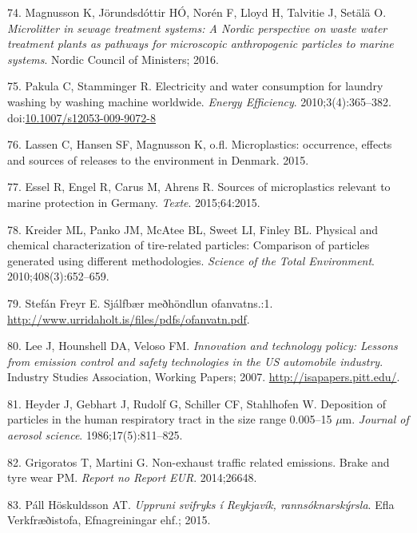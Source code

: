 \documentclass[icelandic,]{book}
\begin{document}
\leavevmode\hypertarget{ref-magnusson2016microlitter}{}%
74. Magnusson K, Jörundsdóttir HÓ, Norén F, Lloyd H, Talvitie J, Setälä O. \emph{Microlitter in sewage treatment systems: A Nordic perspective on waste water treatment plants as pathways for microscopic anthropogenic particles to marine systems}. Nordic Council of Ministers; 2016.

\leavevmode\hypertarget{ref-Pakula2010}{}%
75. Pakula C, Stamminger R. Electricity and water consumption for laundry washing by washing machine worldwide. \emph{Energy Efficiency}. 2010;3(4):365--382. doi:\href{https://doi.org/10.1007/s12053-009-9072-8}{10.1007/s12053-009-9072-8}

\leavevmode\hypertarget{ref-lassen2015microplastics}{}%
76. Lassen C, Hansen SF, Magnusson K, o.fl. Microplastics: occurrence, effects and sources of releases to the environment in Denmark. 2015.

\leavevmode\hypertarget{ref-essel2015sources}{}%
77. Essel R, Engel R, Carus M, Ahrens R. Sources of microplastics relevant to marine protection in Germany. \emph{Texte}. 2015;64:2015.

\leavevmode\hypertarget{ref-kreider2010physical}{}%
78. Kreider ML, Panko JM, McAtee BL, Sweet LI, Finley BL. Physical and chemical characterization of tire-related particles: Comparison of particles generated using different methodologies. \emph{Science of the Total Environment}. 2010;408(3):652--659.

\leavevmode\hypertarget{ref-StefanFreyr}{}%
79. Stefán Freyr E. Sjálfbær meðhöndlun ofanvatns.:1. \url{http://www.urridaholt.is/files/pdfs/ofanvatn.pdf}.

\leavevmode\hypertarget{ref-lee2007innovation}{}%
80. Lee J, Hounshell DA, Veloso FM. \emph{Innovation and technology policy: Lessons from emission control and safety technologies in the US automobile industry}. Industry Studies Association, Working Papers; 2007. \url{http://isapapers.pitt.edu/}.

\leavevmode\hypertarget{ref-heyder1986deposition}{}%
81. Heyder J, Gebhart J, Rudolf G, Schiller CF, Stahlhofen W. Deposition of particles in the human respiratory tract in the size range 0.005--15 \(\mu\)m. \emph{Journal of aerosol science}. 1986;17(5):811--825.

\leavevmode\hypertarget{ref-grigoratos2014non}{}%
82. Grigoratos T, Martini G. Non-exhaust traffic related emissions. Brake and tyre wear PM. \emph{Report no Report EUR}. 2014;26648.

\leavevmode\hypertarget{ref-Efla2015}{}%
83. Páll Höskuldsson AT. \emph{Uppruni svifryks í Reykjavík, rannsóknarskýrsla}. Efla Verkfræðistofa, Efnagreiningar ehf.; 2015.
\end{document}
